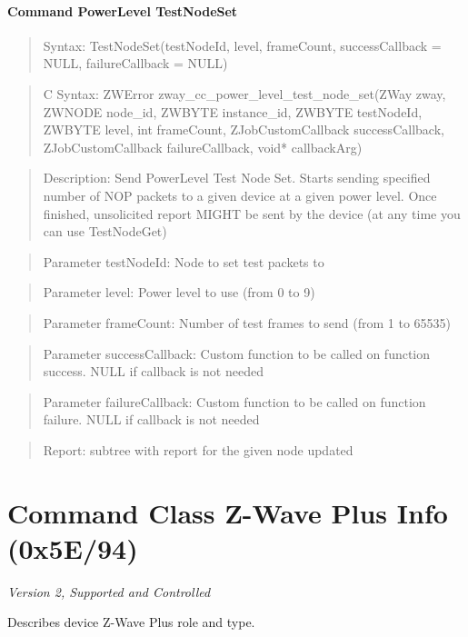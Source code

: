 \paragraph{Command PowerLevel TestNodeSet}
\begin{quote}Syntax: TestNodeSet(testNodeId, level, frameCount, successCallback = NULL, failureCallback = NULL)\end{quote}
\begin{quote}C Syntax: ZWError zway\_cc\_power\_level\_test\_node\_set(ZWay zway, ZWNODE node\_id, ZWBYTE instance\_id, ZWBYTE testNodeId, ZWBYTE level, int frameCount, ZJobCustomCallback successCallback, ZJobCustomCallback failureCallback, void* callbackArg)\end{quote}
\begin{quote}Description: Send PowerLevel Test Node Set. Starts sending specified number of NOP packets to a given device at a given power level. Once finished, unsolicited report MIGHT be sent by the device (at any time you can use TestNodeGet)\end{quote}
\begin{quote}Parameter testNodeId: Node to set test packets to\end{quote}
\begin{quote}Parameter level: Power level to use (from 0 to 9)\end{quote}
\begin{quote}Parameter frameCount: Number of test frames to send (from 1 to 65535)\end{quote}
\begin{quote}Parameter successCallback: Custom function to be called on function success. NULL if callback is not needed\end{quote}
\begin{quote}Parameter failureCallback: Custom function to be called on function failure. NULL if callback is not needed\end{quote}
\begin{quote}Report: subtree with report for the given node updated\end{quote}


\section{Command Class Z-Wave Plus Info (0x5E/94)}

\textit{Version 2, Supported and Controlled}
\newline

Describes device Z-Wave Plus role and type.
\newline

